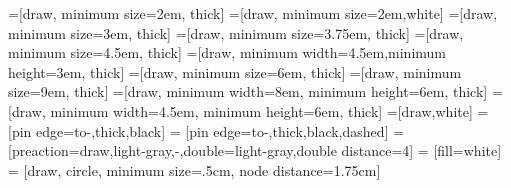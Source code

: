 \makeatletter
\def\ALG@special@indent{%
    \ifdim\ALG@thistlm=0pt\relax
        \hskip-\leftmargin
    \else
        \hskip\ALG@thistlm
    \fi
}
\newcommand{\IState}[1]{\item[]\noindent\ALG@special@indent #1}
 
\makeatother

  \makeatletter
  \newcommand{\thickhline}{%
    \noalign {\ifnum 0=`}\fi \hrule height 1.25pt
    \futurelet \reserved@a \@xhline
  }
  \makeatother
  

  =[draw, minimum size=2em, thick]
  =[draw, minimum size=2em,white]
  =[draw, minimum size=3em, thick]
  =[draw, minimum size=3.75em, thick]
  =[draw, minimum size=4.5em, thick]
  =[draw, minimum width=4.5em,minimum height=3em, thick]
  =[draw, minimum size=6em, thick]
  =[draw, minimum size=9em, thick]
  =[draw, minimum width=8em, minimum height=6em, thick]
  =[draw, minimum width=4.5em, minimum height=6em, thick]
  =[draw,white]
   = [pin edge={to-,thick,black}]
   = [pin edge={to-,thick,black,dashed}]
   = [preaction={draw,light-gray,-,double=light-gray,double distance=4}]
   = [fill=white]
   = [draw, circle, minimum size=.5cm, node distance=1.75cm]
  
  \tikzset{>=latex}   

  \newcommand{\HCR}[1]{{\color{red!66} #1}}
  \newcommand{\HCLR}[1]{{\color{red!66} #1}}
  \newcommand{\HCB}[1]{{\color{blue!66} #1}}
  \newcommand{\HCLB}[1]{{\color{blue!66} #1}}
  \newcommand{\HCG}[1]{{\color{green!66} #1}}
  \newcommand{\HCLG}[1]{{\color{green!50!black!66} #1}}
  \newcommand{\DHDG}[1]{{\color{gray} #1}}
  \newcommand{\DHB}[1]{{\color{black} #1}}
  \newcommand{\DHG}[1]{{\color{light-gray} #1}}
  \newcommand{\HCV}[1]{{\color{violet} #1}}
  \newcommand{\DHLG}[1]{{\color{lightest-gray} #1}}
  \newcommand{\hl}[1]{\colorbox{yellow}{#1}}
  
